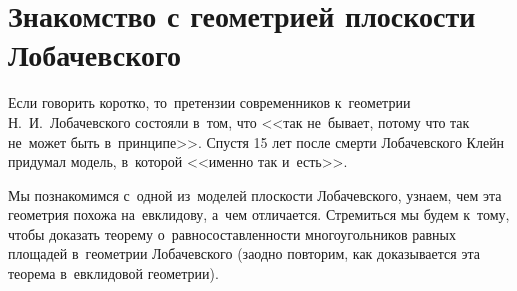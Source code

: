 
\section*{Знакомство с геометрией плоскости Лобачевского}



Если говорить коротко, то~претензии современников к~геометрии
Н.~И.~Лобачевского состояли в~том, что
<<так не~бывает, потому что так не~может быть в~принципе>>.
Спустя 15 лет после смерти Лобачевского Клейн придумал модель, в~которой
<<именно так и~есть>>.

Мы познакомимся с~одной из~моделей плоскости Лобачевского, узнаем, чем эта
геометрия похожа на~евклидову, а~чем отличается.
Стремиться мы будем к~тому, чтобы доказать теорему о~равносоставленности
многоугольников равных площадей в~геометрии Лобачевского
(заодно повторим, как доказывается эта теорема в~евклидовой геометрии).

